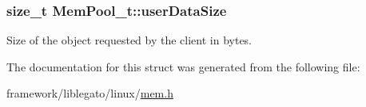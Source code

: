 \subsubsection[{\texorpdfstring{user\+Data\+Size}{userDataSize}}]{\setlength{\rightskip}{0pt plus 5cm}size\+\_\+t Mem\+Pool\+\_\+t\+::user\+Data\+Size}\hypertarget{struct_mem_pool__t_a6b59b1da5f9951f750602bfe544d4b7e}{}\label{struct_mem_pool__t_a6b59b1da5f9951f750602bfe544d4b7e}


Size of the object requested by the client in bytes. 



The documentation for this struct was generated from the following file\+:\begin{DoxyCompactItemize}
\item 
framework/liblegato/linux/\hyperlink{mem_8h}{mem.\+h}\end{DoxyCompactItemize}
